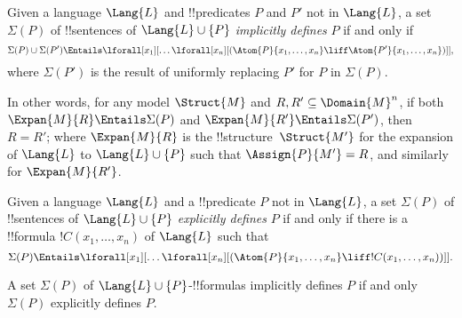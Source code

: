 \documentclass[../../include/open-logic-section]{subfiles}
\begin{document}


\begin{defn}
Given a language $\Lang{L}$ and !!{predicate}s $P$ and $P'$ not in
$\Lang{L}$, a set $\Sigma(P)$ of !!{sentence}s of $\Lang{L} \cup\{P\}$
\emph{implicitly defines} $P$ if and only if
\[
\Sigma(P) \cup \Sigma(P') \Entails \lforall[x_1][\dots
  \lforall[x_n][(\Atom{P}{x_1,\dots, x_n} \liff \Atom{P'}{x_1,\dots,
      x_n})]],
\]
where $\Sigma(P')$ is the result of uniformly replacing $P'$ for $P$
in $\Sigma(P)$.
\end{defn}

In other words, for any model $\Struct{M}$ and $R, R' \subseteq
\Domain{M}^n$, if both $\Expan{M}{R} \Entails \Sigma(P)$ and
$\Expan{M}{R'} \Entails \Sigma(P')$, then $R=R'$; where
$\Expan{M}{R}$ is the !!{structure}~$\Struct{M'}$ for the
expansion of $\Lang{L}$ to $\Lang{L} \cup \{P\}$ such that
$\Assign{P}{M'} = R$, and similarly for $\Expan{M}{R'}$.

\begin{defn}
Given a language $\Lang{L}$ and a !!{predicate} $P$ not in $\Lang{L}$,
a set $\Sigma(P)$ of !!{sentence}s of $\Lang{L} \cup\{P\}$
\emph{explicitly defines} $P$ if and only if there is a !!{formula}
$!C(x_1, \dots, x_n)$ of $\Lang{L}$ such that
\[
\Sigma(P) \Entails \lforall[x_1][\dots
  \lforall[x_n][(\Atom{P}{x_1,\dots, x_n} \liff !C(x_1, \dots,
    x_n))]].
\]
\end{defn}

\begin{thm} A set $\Sigma(P)$ of $\Lang{L}
  \cup\{P\}$-!!{formula}s implicitly defines $P$ if and only $\Sigma(P)$
  explicitly defines $P$.
\end{thm}
\end{document}
